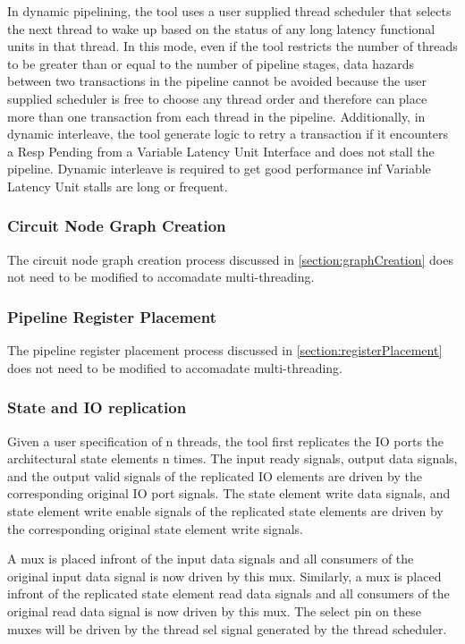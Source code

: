 In dynamic pipelining, the tool uses a user supplied thread scheduler that selects the next thread to wake up based on the status of any long latency functional units in that thread. In this mode, even if the tool restricts the number of threads to be greater than or equal to the number of pipeline stages, data hazards between two transactions in the pipeline cannot be avoided because the user supplied scheduler is free to choose any thread order and therefore can place more than one transaction from each thread in the pipeline. Additionally, in dynamic interleave, the tool generate logic to retry a transaction if it encounters a Resp Pending from a Variable Latency Unit Interface and does not stall the pipeline. Dynamic interleave is required to get good performance inf Variable Latency Unit stalls are long or frequent.

\subsubsection{Circuit Node Graph Creation}
The circuit node graph creation process discussed in \ref{section:graphCreation} does not need to be modified to accomadate multi-threading.

\subsubsection{Pipeline Register Placement}
The pipeline register placement process discussed in \ref{section:registerPlacement} does not need to be modified to accomadate multi-threading.

\subsubsection{State and IO replication}
\label{sec:replication}
Given a user specification of n threads, the tool first replicates the IO ports the architectural state elements n times. The input ready signals, output data signals, and the output valid signals of the replicated IO elements are driven by the corresponding original IO port signals. The state element write data signals, and state element write enable signals of the replicated state elements are driven by the corresponding original state element write signals. 

A mux is placed infront of the input data signals and all consumers of the original input data signal is now driven by this mux. Similarly, a mux is placed infront of the replicated state element read data signals and all consumers of the original read data signal is now driven by this mux. The select pin on these muxes will be driven by the thread sel signal generated by the thread scheduler.

